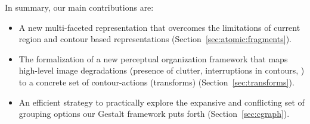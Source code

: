 In summary, our main contributions are:

\begin{itemize}

\item A new multi-faceted representation that overcomes the limitations of current region and contour based representations (Section~\ref{sec:atomic:fragments}). 

\item The formalization of a new perceptual organization framework that maps high-level image degradations (presence of clutter, interruptions in contours, \etc) to a concrete set of contour-actions (transforms) (Section~\ref{sec:transforms}). 

\item An efficient strategy to practically explore the expansive and conflicting set of grouping options our Gestalt framework puts forth (Section~\ref{sec:cgraph}). 



\end{itemize} 




